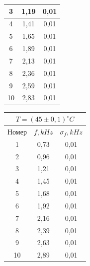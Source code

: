 \documentclass[a4paper, 12pt]{article}%
\begin{document}
\begin{enumerate}
\begin{tabular}{|c|c|c|}
3 & 1,19 & 0,01 \\ \hline
4 & 1,41 & 0,01 \\ \hline
5 & 1,65 & 0,01 \\ \hline
6 & 1,89 & 0,01 \\ \hline
7 & 2,13 & 0,01 \\ \hline
8 & 2,36 & 0,01 \\ \hline
9 & 2,59 & 0,01 \\ \hline
10 & 2,83 & 0,01 \\ \hline
\end{tabular}
\begin{tabular}{|c|c|c|}
\hline
\multicolumn{3}{|c|}{$T = (45 \pm 0,1) ^{\circ}C$} \\ \hline
Номер & $f, kHz$ & $\sigma_f, kHz$ \\ \hline
1 & 0,73 & 0,01 \\ \hline
2 & 0,96 & 0,01 \\ \hline
3 & 1,21 & 0,01 \\ \hline
4 & 1,45 & 0,01 \\ \hline
5 & 1,68 & 0,01 \\ \hline
6 & 1,92 & 0,01 \\ \hline
7 & 2,16 & 0,01 \\ \hline
8 & 2,39 & 0,01 \\ \hline
9 & 2,63 & 0,01 \\ \hline
10 & 2,89 & 0,01 \\ \hline
\end{tabular}


\end{enumerate}
\end{document}
